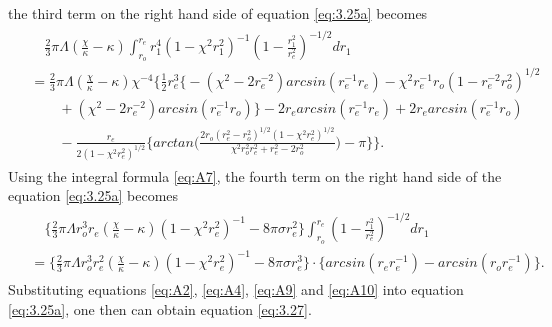 \documentclass[12pt]{article}
\begin{document}
the third term on the right hand side of equation \eqref{eq:3.25a} becomes
\begin{eqnarray}\begin{split}
\label{eq:A9}%
&\quad \frac{2}{3}\pi\Lambda(\frac{\chi}{\kappa}-\kappa)\int_{r_{o}}^{r_{e}}r_{1}^{4}(1-\chi^{2}r_{1}^{2})^{-1}(1-\frac{r_{1}^{2}}{r_{e}^{2}})^{-1/2}dr_{1}
\\&=\frac{2}{3}\pi\Lambda(\frac{\chi}{\kappa}-\kappa)\chi^{-4}\Big\{\frac{1}{2}r_{e}^{3}\big\{-(\chi^{2}-2r_{e}^{-2})arcsin(r_{e}^{-1}r_{e})-\chi^{2}r_{e}^{-1}r_{o}(1-r_{e}^{-2}r_{o}^{2})^{1/2}
\\&\quad \quad+(\chi^{2}-2r_{e}^{-2})arcsin(r_{e}^{-1}r_{o})\big\}-2r_{e}arcsin(r_{e}^{-1}r_{e})+2r_{e}arcsin(r_{e}^{-1}r_{o})
\\&\quad\quad -\frac{r_{e}}{2(1-\chi^{2}r_{e}^{2})^{1/2}}\big\{arctan\big(\frac{2r_{o}(r_{e}^{2}-r_{o}^{2})^{1/2}(1-\chi^{2}r_{e}^{2})^{1/2}}{\chi^{2}r_{o}^{2}r_{e}^{2}+r_{e}^{2}-2r_{o}^{2}}\big)-\pi\big\}\Big\}.
\end{split}
\end{eqnarray}
Using the integral formula \eqref{eq:A7}, the fourth term on the right hand side of the equation \eqref{eq:3.25a} becomes
\begin{eqnarray}\begin{split}
\label{eq:A10}%
&\quad\big\{\frac{2}{3}\pi\Lambda r_{o}^{3}r_{e}(\frac{\chi}{\kappa}-\kappa)(1-\chi^{2}r_{e}^{2})^{-1}-8\pi\sigma r_{e}^{2}\big\}\int_{r_{o}}^{r_{e}}(1-\frac{r_{1}^{2}}{r_{e}^{2}})^{-1/2}dr_{1}\\&=\big\{\frac{2}{3}\pi\Lambda r_{o}^{3}r_{e}^{2}(\frac{\chi}{\kappa}-\kappa)(1-\chi^{2}r_{e}^{2})^{-1}-8\pi\sigma r_{e}^{3}\big\}\cdot\big\{arcsin(r_{e}r_{e}^{-1})-arcsin(r_{o}r_{e}^{-1})\big\}.
\end{split}
\end{eqnarray}
Substituting equations \eqref{eq:A2}, \eqref{eq:A4}, \eqref{eq:A9} and \eqref{eq:A10} into equation \eqref{eq:3.25a}, one then can obtain equation \eqref{eq:3.27}.
\end{document}
